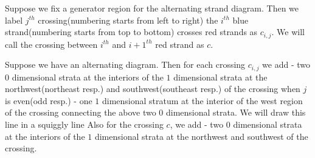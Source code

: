 Suppose we fix a generator region for the alternating strand diagram. Then we label $j^{th}$ crossing(numbering starts from left to right) the $i^{th}$ blue strand(numbering starts from top to bottom) crosses red strands as $c_{i,j}$. We will call the crossing between $i^{th}$ and $i+1^{th}$ red strand as $c$.

Suppose we have an alternating diagram. Then for each crossing $c_{i,j}$ we add 
- two $0$ dimensional strata at the interiors of the $1$ dimensional strata at the northwest(northeast resp.) and southwest(southeast resp.) of the crossing when $j$ is even(odd resp.)
- one $1$ dimensional stratum at the interior of the west region of the crossing connecting the above two $0$ dimensional strata. We will draw this line in a squiggly line
Also for the crossing $c$, we add
- two $0$ dimensional strata at the interiors of the $1$ dimensional strata at the northwest and southwest of the crossing.
 

